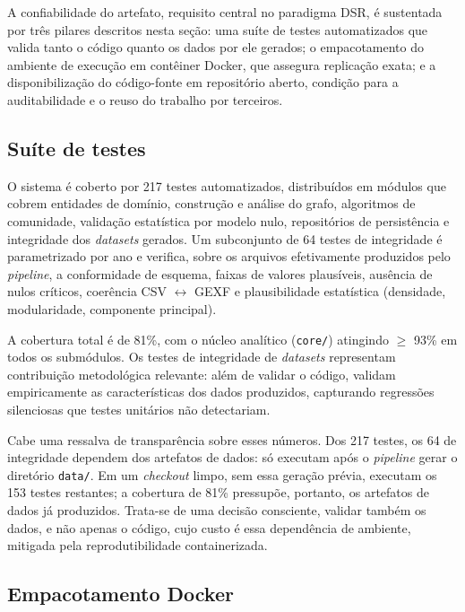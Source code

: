 \documentclass[
      12pt,
      a4paper,
      openright,
      oneside,
      chapter=TITLE,
      section=TITLE,
      english,
      french,
      spanish,
      brazilian
    ]{abntex2}
\begin{document}
    A confiabilidade do artefato, requisito central no paradigma DSR, é sustentada por três pilares descritos nesta seção: uma suíte de testes automatizados que valida tanto o código quanto os dados por ele gerados; o empacotamento do ambiente de execução em contêiner Docker, que assegura replicação exata; e a disponibilização do código-fonte em repositório aberto, condição para a auditabilidade e o reuso do trabalho por terceiros.

    \subsection{Suíte de testes}
    \label{subsec:suite}
    
    O sistema é coberto por 217 testes automatizados, distribuídos em módulos que
    cobrem entidades de domínio, construção e análise do grafo, algoritmos de
    comunidade, validação estatística por modelo nulo, repositórios de persistência e
    integridade dos \textit{datasets} gerados. Um subconjunto de 64 testes de integridade é
    parametrizado por ano e verifica, sobre os arquivos efetivamente produzidos pelo
    \textit{pipeline}, a conformidade de esquema, faixas de valores plausíveis, ausência de
    nulos críticos, coerência CSV $\leftrightarrow$ GEXF e plausibilidade estatística
    (densidade, modularidade, componente principal).
    
    A cobertura total é de 81\%, com o núcleo analítico (\texttt{core/}) atingindo
    $\geq$ 93\% em todos os submódulos. Os testes de integridade de \textit{datasets}
    representam contribuição metodológica relevante: além de validar o código,
    validam empiricamente as características dos dados produzidos, capturando
    regressões silenciosas que testes unitários não detectariam.

    Cabe uma ressalva de transparência sobre esses números. Dos 217 testes, os 64 de
    integridade dependem dos artefatos de dados: só executam após o \textit{pipeline} gerar o
    diretório \texttt{data/}. Em um \textit{checkout} limpo, sem essa geração prévia,
    executam os 153 testes restantes; a cobertura de 81\% pressupõe, portanto, os
    artefatos de dados já produzidos. Trata-se de uma decisão consciente, validar
    também os dados, e não apenas o código, cujo custo é essa dependência de
    ambiente, mitigada pela reprodutibilidade containerizada.
    
    \subsection{Empacotamento Docker}
    
\end{document}
